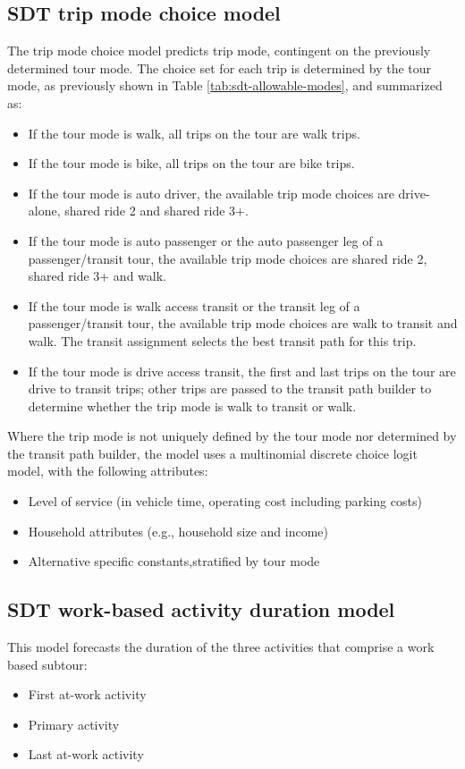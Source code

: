 \subsection{SDT trip mode choice model}\label{sec:sdt-trip-mode-choice}
The trip mode choice model predicts trip mode, contingent on the previously determined tour mode. The choice set for each trip is determined by the tour mode, as previously shown in Table \ref{tab:sdt-allowable-modes}, and summarized as:
\begin{itemize}
\item If the tour mode is walk, all trips on the tour are walk trips.
\item If the tour mode is bike, all trips on the tour are bike trips.
\item If the tour mode is auto driver, the available trip mode choices are drive-alone, shared ride 2 and shared ride 3+.
\item If the tour mode is auto passenger or the auto passenger leg of a passenger/transit tour, the available trip mode choices are shared ride 2, shared ride 3+ and walk.
\item If the tour mode is walk access transit or the transit leg of a passenger/transit tour, the available trip mode choices are walk to transit and walk. The transit assignment selects the best transit path for this trip.
\item If the tour mode is drive access transit, the first and last trips on the tour are drive to transit trips; other trips are passed to the transit path builder to determine whether the trip mode is walk to transit or walk.
\end{itemize}

Where the trip mode is not uniquely defined by the tour mode nor determined by the transit path builder, the model uses a multinomial discrete choice logit model, with the following attributes:
\begin{itemize}
\item Level of service (in vehicle time, operating cost including parking costs)
\item Household attributes (e.g., household size and income)
\item Alternative specific constants,stratified by tour mode
\end{itemize}

\subsection{SDT work-based activity duration model}
This model forecasts the duration of the three activities that comprise a work based subtour:
\begin{itemize}
\item First at-work activity
\item Primary activity
\item Last at-work activity
\end{itemize} 

